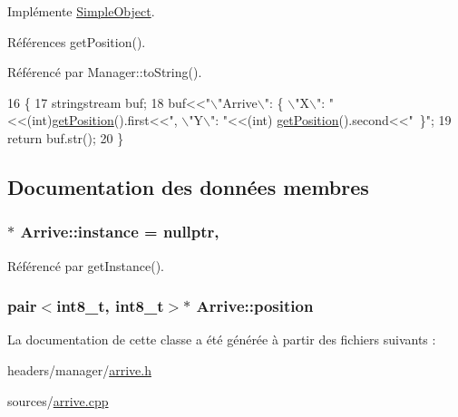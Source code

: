 Implémente \hyperlink{classSimpleObject_aedf0ddcc119ab40623b5b69badc9531a}{Simple\-Object}.



Références get\-Position().



Référencé par Manager\-::to\-String().


\begin{DoxyCode}
16                           \{
17     stringstream buf;
18     buf<<\textcolor{stringliteral}{"\(\backslash\)"Arrive\(\backslash\)": \{ \(\backslash\)"X\(\backslash\)": "}<<(int)\hyperlink{classArrive_abe91e4a5bcf15ff987ab58c05b6bb537}{getPosition}().first<<\textcolor{stringliteral}{", \(\backslash\)"Y\(\backslash\)": "}<<(int)
      \hyperlink{classArrive_abe91e4a5bcf15ff987ab58c05b6bb537}{getPosition}().second<<\textcolor{stringliteral}{" \}"};
19     \textcolor{keywordflow}{return} buf.str();
20 \}\end{DoxyCode}


\subsection{Documentation des données membres}
\hypertarget{classArrive_a92c9b9165c713ff9151d8720660837ef}{
\subsubsection[{instance}]{ $\ast$ Arrive\-::instance = nullptr\hspace{0.3cm}{\ttfamily [static]}, {\ttfamily [private]}}}\label{classArrive_a92c9b9165c713ff9151d8720660837ef}


Référencé par get\-Instance().

\hypertarget{classArrive_aa47d57970460b95cfbcdbe62e22dfac7}{
\subsubsection[{position}]{\setlength{\rightskip}{0pt plus 5cm}pair$<$int8\-\_\-t, int8\-\_\-t$>$$\ast$ Arrive\-::position\hspace{0.3cm}{\ttfamily [private]}}}\label{classArrive_aa47d57970460b95cfbcdbe62e22dfac7}


La documentation de cette classe a été générée à partir des fichiers suivants \-:\begin{DoxyCompactItemize}
\item 
headers/manager/\hyperlink{arrive_8h}{arrive.\-h}\item 
sources/\hyperlink{arrive_8cpp}{arrive.\-cpp}\end{DoxyCompactItemize}
